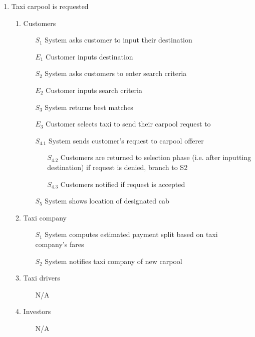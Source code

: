 \documentclass[]{article}
\begin{document}
\begin{enumerate}[{\textbf{BE}}1.]
    \item Taxi carpool is requested
    \begin{enumerate}[{\textbf{VP4}}.1]
        \item Customers
            \begin{enumerate}
                \item[$S_1$] System asks customer to input their destination
                \item[$E_1$] Customer inputs destination
	     \item[$S_2$] System asks customers to enter search criteria
	     \item[$E_2$] Customer inputs search criteria
 	     \item[$S_3$] System returns best matches
                \item[$E_3$] Customer selects taxi to send their carpool request to
\item[$S_{4.1}$] System sends customer's request to carpool offerer
                \begin{enumerate}
                    \item[$S_{4.2}$] Customers are returned to selection phase (i.e. after inputting destination) if request is denied, branch to S2
                    \item[$S_{4.3}$] Customers notified if request is accepted
                \end{enumerate}
                \item[$S_5$] System shows location of designated cab
            \end{enumerate}
        \item Taxi company
            \begin{enumerate}
                \item[$S_1$] System computes estimated payment split based on taxi company's fares
	        \item[$S_2$] System notifies taxi company of new carpool
            \end{enumerate}
        \item Taxi drivers
            \begin{enumerate}
                \item[N/A]
            \end{enumerate}
        \item Investors
            \begin{enumerate}
                \item[N/A]
            \end{enumerate}

\end{enumerate}
\end{enumerate}
\end{document}
